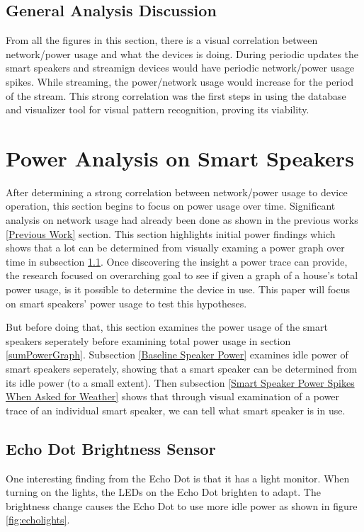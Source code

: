 \subsection{General Analysis Discussion}
From all the figures in this section, there is a visual correlation between network/power usage and what the devices is doing. During periodic updates the smart speakers and streamign devices would have periodic network/power usage spikes. While streaming, the power/network usage would increase for the period of the stream. This strong correlation was the first steps in using the database and visualizer tool for visual pattern recognition, proving its viability.

\section{Power Analysis on Smart Speakers}
\label{Power Analysis on Smart Speakers}

After determining a strong correlation between network/power usage to device operation, this section begins to focus on power usage over time. Significant analysis on network usage had already been done as shown in the previous works \ref{Previous Work} section. This section highlights initial power findings which shows that a lot can be determined from visually examing a power graph over time in subsection \ref{Echo Dot Brightness Sensor}. Once discovering the insight a power trace can provide, the research focused on overarching goal to see if given a graph of a house's total power usage, is it possible to determine the device in use. This paper will focus on smart speakers' power usage to test this hypotheses.

But before doing that, this section examines the power usage of the smart speakers seperately before examining total power usage in section \ref{sumPowerGraph}. Subsection \ref{Baseline Speaker Power} examines idle power of smart speakers seperately, showing that a smart speaker can be determined from its idle power (to a small extent). Then subsection \ref{Smart Speaker Power Spikes When Asked for Weather} shows that through visual examination of a power trace of an individual smart speaker, we can tell what smart speaker is in use.

\subsection{Echo Dot Brightness Sensor}
\label{Echo Dot Brightness Sensor}
One interesting finding from the Echo Dot is that it has a light monitor. When turning on the lights, the LEDs on the Echo Dot brighten to adapt. The brightness change causes the Echo Dot to use more idle power as shown in figure \ref{fig:echolights}.

